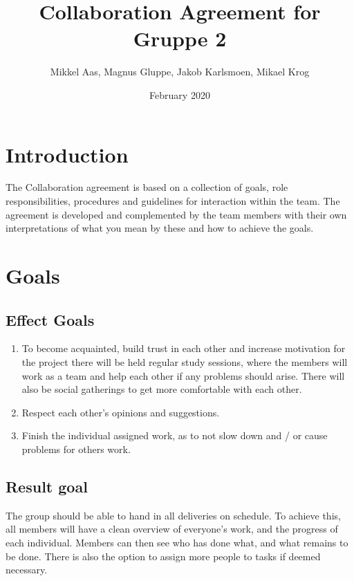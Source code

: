 \documentclass{article}
\title{Collaboration Agreement for Gruppe 2}
\author{Mikkel Aas, Magnus Gluppe, Jakob Karlsmoen, Mikael Krog}
\date{February 2020}
\begin{document}
\maketitle

\section{Introduction}
The Collaboration agreement is based on a collection of goals, role responsibilities, procedures and guidelines for interaction within the team. The agreement is developed and complemented by the team members with their own interpretations of what you mean by these and how to achieve the goals.

\section{Goals}
\subsection{Effect Goals}
\begin{enumerate}
    \item To become acquainted, build trust in each other and increase motivation for the project there will be held regular study sessions, where the members will work as a team and help each other if any problems should arise. There will also be social gatherings to get more comfortable with each other. 
    \item Respect each other's opinions and suggestions.
    \item Finish the individual assigned work, as to not slow down and / or cause problems for others work.
\end{enumerate}
   
\subsection{Result goal}
    The group should be able to hand in all deliveries on schedule. To achieve this, all members will have a clean overview of everyone's work, and the progress of each individual. Members can then see who has done what, and what remains to be done. There is also the option to assign more people to tasks if deemed necessary.
    
\end{document}
